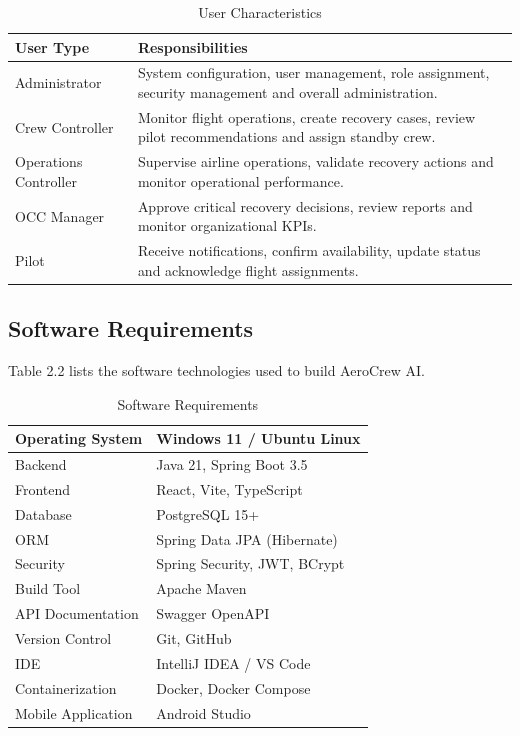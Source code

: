 \documentclass[12pt,a4paper]{report}
\begin{document}
\begin{table}[H]
\centering
\caption{User Characteristics}
\begin{tabular}{|p{4cm}|p{10cm}|}
\hline
\textbf{User Type} & \textbf{Responsibilities}\\
\hline

Administrator &
System configuration, user management, role assignment, security management and overall administration.\\
\hline

Crew Controller &
Monitor flight operations, create recovery cases, review pilot recommendations and assign standby crew.\\
\hline

Operations Controller &
Supervise airline operations, validate recovery actions and monitor operational performance.\\
\hline

OCC Manager &
Approve critical recovery decisions, review reports and monitor organizational KPIs.\\
\hline

Pilot &
Receive notifications, confirm availability, update status and acknowledge flight assignments.\\
\hline

\end{tabular}
\end{table}

\subsection{Software Requirements}

Table 2.2 lists the software technologies used to build AeroCrew AI.

\begin{table}[H]
\centering
\caption{Software Requirements}
\begin{tabular}{|p{5cm}|p{8cm}|}
\hline
Operating System & Windows 11 / Ubuntu Linux\\
\hline
Backend & Java 21, Spring Boot 3.5\\
\hline
Frontend & React, Vite, TypeScript\\
\hline
Database & PostgreSQL 15+\\
\hline
ORM & Spring Data JPA (Hibernate)\\
\hline
Security & Spring Security, JWT, BCrypt\\
\hline
Build Tool & Apache Maven\\
\hline
API Documentation & Swagger OpenAPI\\
\hline
Version Control & Git, GitHub\\
\hline
IDE & IntelliJ IDEA / VS Code\\
\hline
Containerization & Docker, Docker Compose\\
\hline
Mobile Application & Android Studio\\
\hline
\end{tabular}
\end{table}
\end{document}
